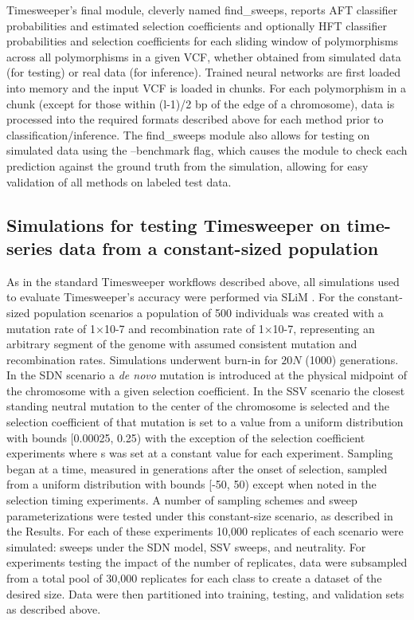 Timesweeper’s final module, cleverly named find\_sweeps, reports AFT classifier probabilities and estimated selection coefficients and optionally HFT classifier probabilities and selection coefficients for each sliding window of polymorphisms across all polymorphisms in a given VCF, whether obtained from simulated data (for testing) or real data (for inference). Trained neural networks are first loaded into memory and the input VCF is loaded in chunks. For each polymorphism in a chunk (except for those within (l-1)/2 bp of the edge of a chromosome), data is processed into the required formats described above for each method prior to classification/inference. The find\_sweeps module also allows for testing on simulated data using the --benchmark flag, which causes the module to check each prediction against the ground truth from the simulation, allowing for easy validation of all methods on labeled test data. \\

\subsection{Simulations for testing Timesweeper on time-series data from a constant-sized population } 

As in the standard Timesweeper workflows described above, all simulations used to evaluate Timesweeper’s accuracy were performed via SLiM \cite{hallerSLiMForwardGenetic2019}. For the constant-sized population scenarios a population of 500 individuals was created with a mutation rate of 1×10-7 and recombination rate of 1×10-7, representing an arbitrary segment of the genome with assumed consistent mutation and recombination rates. Simulations underwent burn-in for $20N$ (1000) generations. In the SDN scenario a \textit{de novo} mutation is introduced at the physical midpoint of the chromosome with a given selection coefficient. In the SSV scenario the closest standing neutral mutation to the center of the chromosome is selected and the selection coefficient of that mutation is set to a value from a uniform distribution with bounds [0.00025, 0.25) with the exception of the selection coefficient experiments where s was set at a constant value for each experiment. Sampling began at a time, measured in generations after the onset of selection, sampled from a uniform distribution with bounds [-50, 50) except when noted in the selection timing experiments. A number of sampling schemes and sweep parameterizations were tested under this constant-size scenario, as described in the Results. For each of these experiments 10,000 replicates of each scenario were simulated: sweeps under the SDN model, SSV sweeps, and neutrality. For experiments testing the impact of the number of replicates, data were subsampled from a total pool of 30,000 replicates for each class to create a dataset of the desired size. Data were then partitioned into training, testing, and validation sets as described above. \\

